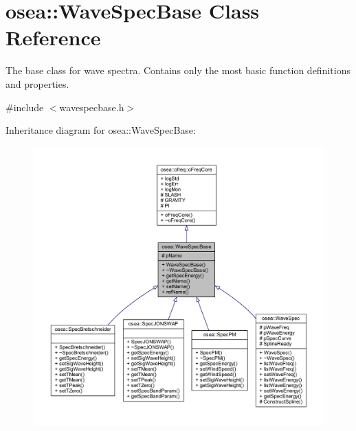 \hypertarget{classosea_1_1_wave_spec_base}{\section{osea\-:\-:Wave\-Spec\-Base Class Reference}
\label{classosea_1_1_wave_spec_base}
}


The base class for wave spectra. Contains only the most basic function definitions and properties.  




{\ttfamily \#include $<$wavespecbase.\-h$>$}



Inheritance diagram for osea\-:\-:Wave\-Spec\-Base\-:
\nopagebreak
\begin{figure}[H]
\begin{center}
\leavevmode
\includegraphics[width=350pt]{classosea_1_1_wave_spec_base__inherit__graph}
\end{center}
\end{figure}
